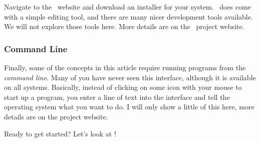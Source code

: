 Navigate to the \PY\ website \cite{python} and download an installer for your
system. \PY\ does come with a simple editing tool, and there are many nicer
development tools available. We will not explore those tools here. More details
are on the \MM\ project website.

\subsubsection{Command Line}

Finally, some of the concepts in this article require running programs from the
{\it command line}. Many of you have never seen this interface, although it is
available on all systems. Basically, instead of clicking on some icon with
your mouse to start up a program, you enter a line of text into the interface
and tell the operating system what you want to do. I will only show a little of
this  here, more details are on the project website.

Ready to get started? Let's look at \osc!


